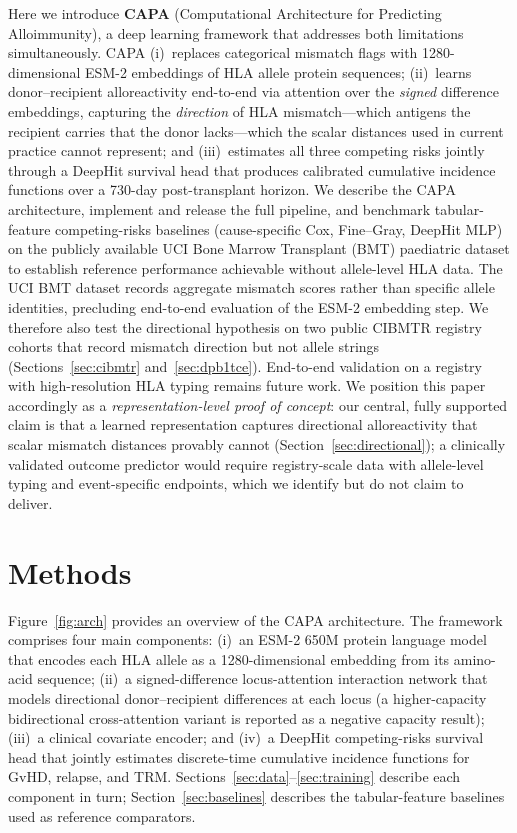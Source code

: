 \documentclass[11pt,a4paper]{article}
\begin{document}
Here we introduce \textbf{CAPA} (Computational Architecture for Predicting
Alloimmunity), a deep learning framework that addresses both limitations
simultaneously.  CAPA (i)~replaces categorical mismatch flags with
1280-dimensional ESM-2 embeddings of HLA allele protein sequences;
(ii)~learns donor--recipient alloreactivity end-to-end via attention over the
\emph{signed} difference embeddings, capturing the \emph{direction} of HLA
mismatch---which antigens the recipient carries that the donor lacks---which
the scalar distances used in current practice cannot represent; and (iii)~estimates all
three competing risks jointly through a DeepHit survival head
\citep{lee2018deephit} that produces calibrated cumulative incidence functions
over a 730-day post-transplant horizon.
We describe the CAPA architecture, implement and release the full pipeline, and
benchmark tabular-feature competing-risks baselines (cause-specific Cox,
Fine--Gray, DeepHit MLP) on the publicly available UCI Bone Marrow Transplant
(BMT) paediatric dataset \citep{sikora2010bmt} to establish reference
performance achievable without allele-level HLA data.  The UCI BMT dataset
records aggregate mismatch scores rather than specific allele identities,
precluding end-to-end evaluation of the ESM-2 embedding step.  We therefore
also test the directional hypothesis on two public CIBMTR registry cohorts
that record mismatch direction but not allele strings
(Sections~\ref{sec:cibmtr} and~\ref{sec:dpb1tce}).  End-to-end validation on
a registry with high-resolution HLA typing remains future work.  We position
this paper accordingly as a
\emph{representation-level proof of concept}: our central, fully supported claim
is that a learned representation captures directional alloreactivity that scalar
mismatch distances provably cannot (Section~\ref{sec:directional}); a
clinically validated outcome predictor would require registry-scale data with
allele-level typing and event-specific endpoints, which we identify but do not
claim to deliver.

\section{Methods}

Figure~\ref{fig:arch} provides an overview of the CAPA architecture.  The
framework comprises four main components: (i)~an ESM-2 650M protein language
model that encodes each HLA allele as a 1280-dimensional embedding from its
amino-acid sequence; (ii)~a signed-difference locus-attention interaction
network that models directional donor--recipient differences at each locus
(a higher-capacity bidirectional cross-attention variant is reported as a
negative capacity result); (iii)~a clinical
covariate encoder; and (iv)~a DeepHit competing-risks survival head that
jointly estimates discrete-time cumulative incidence functions for GvHD,
relapse, and TRM.  Sections~\ref{sec:data}--\ref{sec:training} describe each
component in turn; Section~\ref{sec:baselines} describes the tabular-feature
baselines used as reference comparators.
\end{document}
